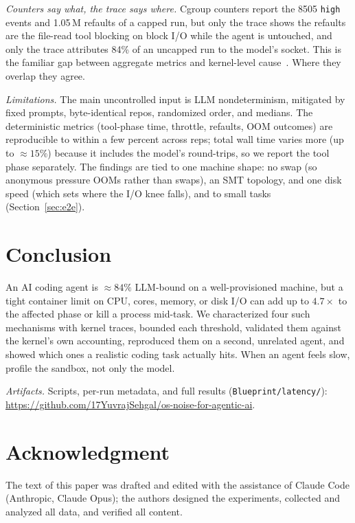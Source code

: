 \documentclass[10pt,conference]{IEEEtran}
\begin{document}
\emph{Counters say what, the trace says where.} Cgroup counters report the
8505 \texttt{high} events and 1.05\,M refaults of a capped run, but only the
trace shows the refaults are the file-read tool blocking on block I/O while
the agent is untouched, and only the trace attributes 84\% of an uncapped
run to the model's socket. This is the familiar gap between aggregate
metrics and kernel-level cause~\cite{ezzati2018}. Where they overlap they
agree.

\emph{Limitations.} The main uncontrolled input is LLM nondeterminism,
mitigated by fixed prompts, byte-identical repos, randomized order, and
medians. The deterministic metrics (tool-phase time, throttle, refaults, OOM
outcomes) are reproducible to within a few percent across reps; total wall
time varies more (up to ${\approx}15\%$) because it includes the model's
round-trips, so we report the tool phase separately. The findings
are tied to one machine shape: no swap (so anonymous pressure OOMs rather
than swaps), an SMT topology, and one disk speed (which sets where the I/O
knee falls), and to small tasks (Section~\ref{sec:e2e}).

\section{Conclusion}

An AI coding agent is ${\approx}84\%$ LLM-bound on a well-provisioned
machine, but a tight container limit on CPU, cores, memory, or disk I/O can
add up to $4.7\times$ to the affected phase or kill a process mid-task. We
characterized four such mechanisms with kernel traces, bounded each
threshold, validated them against the kernel's own accounting, reproduced
them on a second, unrelated agent, and showed which ones a realistic coding
task actually hits. When an agent feels slow, profile the sandbox, not only
the model.

\emph{Artifacts.} Scripts, per-run metadata, and full results
(\texttt{Blueprint/latency/}):
\url{https://github.com/17YuvrajSehgal/os-noise-for-agentic-ai}.

\section*{Acknowledgment}
The text of this paper was drafted and edited with the assistance of Claude
Code (Anthropic, Claude Opus); the authors designed the experiments,
collected and analyzed all data, and verified all content.
\end{document}
